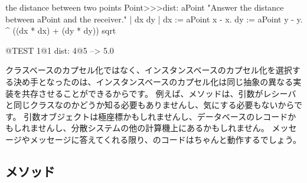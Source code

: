 \documentclass[a4paper,10pt,twoside]{book}
\begin{document}
\begin{method}[dist:]{the distance between two points}
Point>>>dist: aPoint 
	"Answer the distance between aPoint and the receiver."  
	| dx dy |
	dx := aPoint x - x.
	dy :=  aPoint y - y.
	^ ((dx * dx) + (dy * dy)) sqrt
\end{method}

\begin{code}{@TEST}
1@1 dist: 4@5 --> 5.0
\end{code}

クラスベースのカプセル化ではなく、インスタンスベースのカプセル化を選択する決め手となったのは、インスタンスベースのカプセル化は同じ抽象の異なる実装を共存させることができるからです。
例えば、メソッドは、引数がレシーバと同じクラスなのかどうか知る必要もありませんし、気にする必要もないからです。
引数オブジェクトは極座標かもしれませんし、データベースのレコードかもしれませんし、分散システムの他の計算機上にあるかもしれません。
メッセージやメッセージに答えてくれる限り、のコードはちゃんと動作するでしょう。

\subsection{メソッド}
\end{document}
